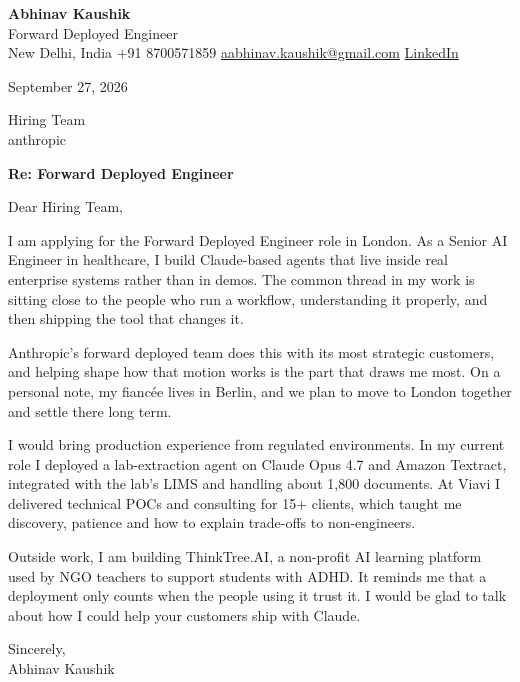 \documentclass[11pt,a4paper]{article}
\begin{document}
{\Large\bfseries Abhinav Kaushik}\\
Forward Deployed Engineer\\
New Delhi, India \textbar{} +91 8700571859 \textbar{} \href{mailto:aabhinav.kaushik@gmail.com}{aabhinav.kaushik@gmail.com} \textbar{} \href{https://www.linkedin.com/in/abhinav-kaushik10/}{LinkedIn}  

September 27, 2026

Hiring Team\\
anthropic

\textbf{Re: Forward Deployed Engineer}

Dear Hiring Team,

I am applying for the Forward Deployed Engineer role in London. As a Senior AI Engineer in healthcare, I build Claude-based agents that live inside real enterprise systems rather than in demos. The common thread in my work is sitting close to the people who run a workflow, understanding it properly, and then shipping the tool that changes it.

Anthropic's forward deployed team does this with its most strategic customers, and helping shape how that motion works is the part that draws me most. On a personal note, my fiancée lives in Berlin, and we plan to move to London together and settle there long term.

I would bring production experience from regulated environments. In my current role I deployed a lab-extraction agent on Claude Opus 4.7 and Amazon Textract, integrated with the lab's LIMS and handling about 1,800 documents. At Viavi I delivered technical POCs and consulting for 15+ clients, which taught me discovery, patience and how to explain trade-offs to non-engineers.

Outside work, I am building ThinkTree.AI, a non-profit AI learning platform used by NGO teachers to support students with ADHD. It reminds me that a deployment only counts when the people using it trust it. I would be glad to talk about how I could help your customers ship with Claude.

Sincerely,\\[4pt]
Abhinav Kaushik
\end{document}
